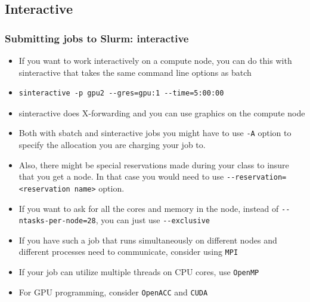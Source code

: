 \documentclass{beamer}
\begin{document}
\subsection{Interactive}
\begin{frame}[fragile]
  \frametitle{Submitting jobs to Slurm: interactive}
  \begin{itemize}
  \item If you want to work interactively on a compute node, you can do this with {\color{mycolorcli}sinteractive} that takes the same command line options as batch
  \item
{\color{mycolorcli} 
\begin{verbatim}
sinteractive -p gpu2 --gres=gpu:1 --time=5:00:00
\end{verbatim}
}
\item {\color{mycolorcli}sinteractive} does X-forwarding and you can use graphics on the compute node
\item Both with sbatch and sinteractive jobs you might have to use {\color{mycolorcli}\verb|-A|} option to specify the allocation you are charging your job to.
\item Also, there might be special reservations made during your class to insure that you get a node. In that case you would need to use  {\color{mycolorcli}\verb|--reservation=<reservation name>|} option.
\item If you want to ask for all the cores and memory in the node, instead of {\color{mycolorcli}\verb|--ntasks-per-node=28|}, you can just use {\color{mycolorcli}\verb|--exclusive|}
\item If you have such a job that runs simultaneously on different nodes and different processes need to communicate, consider using {\color{mycolordef}\verb|MPI|}
\item If your job can utilize multiple threads on CPU cores, use {\color{mycolordef}\verb|OpenMP|}
\item For GPU programming, consider {\color{mycolordef}\verb|OpenACC|} and {\color{mycolordef}\verb|CUDA|}

  \end{itemize}

\end{frame}
\end{document}
